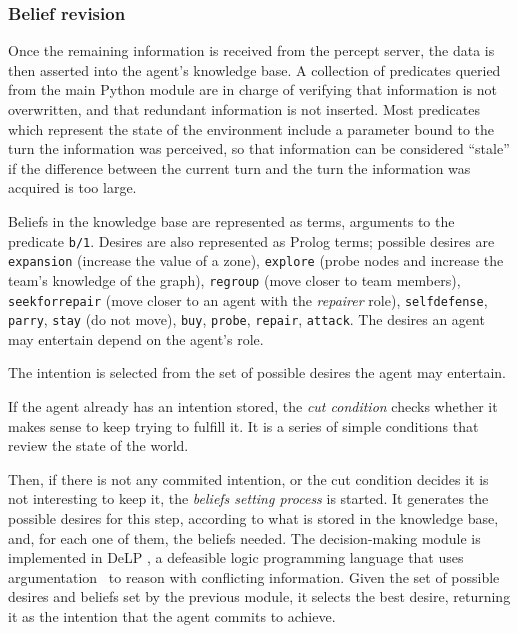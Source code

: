 \subsubsection{Belief revision}
    Once the remaining information is received from the percept server, the data
    is then asserted into the agent's knowledge base. A collection of predicates
    queried from the main Python module are in charge of verifying that
    information is not overwritten, and that redundant information is not
    inserted. Most predicates which represent the state of the environment
    include a parameter bound to the turn the information was perceived, so that
    information can be considered ``stale'' if the difference between the
    current turn and the turn the information was acquired is too large.
    
    Beliefs in the knowledge base are represented as terms, arguments to the
    predicate \texttt{b/1}.  Desires are also represented as Prolog terms;
    possible desires are \texttt{expansion} (increase the value of a zone),
    \texttt{explore} (probe nodes and increase the team's knowledge of the
    graph), \texttt{regroup} (move closer to team members),
    \texttt{seekforrepair} (move closer to an agent with the \textit{repairer}
    role), \texttt{selfdefense}, \texttt{parry}, \texttt{stay} (do not move),
    \texttt{buy}, \texttt{probe}, \texttt{repair}, \texttt{attack}. The desires
    an agent may entertain depend on the agent's role. 
    
    The intention is selected from the set of possible desires the agent may
    entertain. 

    If the agent already has an intention stored, the \textit{cut condition}
    checks whether it makes sense to keep trying to fulfill it. It is a series
    of simple conditions that review the state of the world.

    Then, if there is not any commited intention, or the cut condition decides
    it is not interesting to keep it, the \textit{beliefs setting process} is
    started. It generates the possible desires for this step, according to what
    is stored in the knowledge base, and, for each one of them, the beliefs
    needed.  The decision-making module is implemented in
    DeLP\cite{Rotstein:2007} \cite{Ferretti:2008}, a defeasible logic
    programming language that uses argumentation \cite{DBLP:conf/comma/2008}\ to
    reason with conflicting information.  Given the set of possible desires and
    beliefs set by the previous module, it selects the best desire, returning it
    as the intention that the agent commits to achieve.


